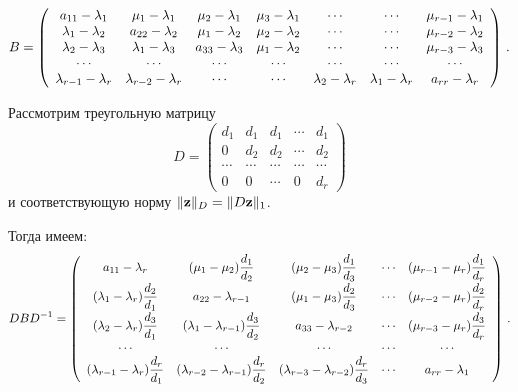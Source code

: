 \begin{equation*}
B = \left(
\begin{array}{cccccccc}
a_{11}- \la_1   & \mu_1 - \la_1   & \mu_2 - \la_1   & \mu_3 -\la_1   & \cdots& \cdots & \mu_{r-1}- \la_1  \\
\la_1 -\la_2    & a_{22} -\la_2  & \mu_1-\la_2   & \mu_2 -\la_2     & \cdots&  \cdots & \mu_{r-2} -\la_2 \\
\la_2 -\la_3    & \la_1 -\la_3   & a_{33} -\la_3  & \mu_1-\la_2   & \cdots&  \cdots & \mu_{r-3} -\la_3 \\
\cdots&\cdots&\cdots&\cdots&\cdots&\cdots&\cdots \\
\la_{r-1} -\la_r  &\la_{r-2} -\la_r & \cdots & \cdots & \la_2 -\la_r   & \la_1 -\la_r     &  a_{rr} -\la_r
\end{array}
\right)\,.
\end{equation*}

Рассмотрим треугольную матрицу
\begin{equation*}
D=\begin{pmatrix}
d_1   & d_1 & d_1 & \cdots & d_1 \\
0   & d_2  & d_2  &   \cdots & d_2 \\
\cdots&\cdots&\cdots&\cdots&\cdots \\
0  & 0 & \cdots & 0 &  d_r
\end{pmatrix}
\end{equation*}
и соответствующую норму $\|{\bf z}\|_{D}\hm=\|D {\bf z}\|_1$.

Тогда имеем:
\begin{equation*}
 D BD^{-1}=\left(
\begin{array}{ccccccc}
a_{11}-\la_r  &  (\mu_1-\mu_2) \fr{d_1}{d_2}  & (\mu_2-\mu_3)\fr{d_1}{d_3}  & \cdots &  (\mu_{r-1}-\mu_r)\fr{d_1}{d_r} \\
(\la_1-\la_r) \fr{d_2}{d_1} &  a_{22}-\la_{r-1}  &(\mu_1-\mu_3)\fr{d_2}{d_3}  & \cdots &  (\mu_{r-2}-\mu_r)\fr{d_2}{d_r} \\
(\la_2-\la_r) \fr{d_3}{d_1} &  (\la_1-\la_{r-1})\fr{d_3}{d_2}   &a_{33}-\la_{r-2}   & \cdots &  (\mu_{r-3}-\mu_r)
\fr{d_3}{d_r}  \\
\cdots&\cdots&\cdots&\cdots&\cdots \\
(\la_{r-1} -\la_r) \fr{d_r}{d_1} & (\la_{r-2} -\la_{r-1}) \fr{d_r}{d_2}  & (\la_{r-3} -\la_{r-2}) \fr{d_r}{d_3}  & \cdots & a_{rr}-\la_1 \\
\end{array}
\right)\,.
\end{equation*}



